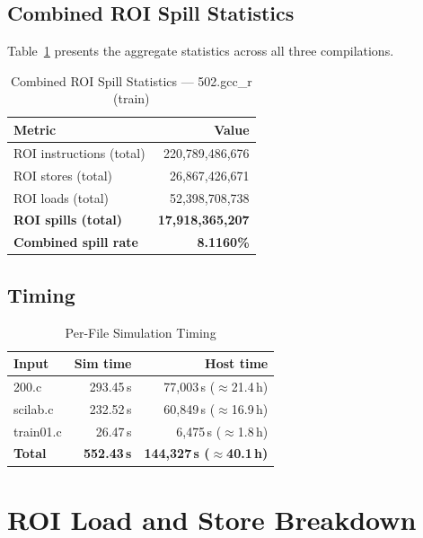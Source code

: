 \documentclass[conference]{IEEEtran}
\begin{document}
\subsection{Combined ROI Spill Statistics}

Table~\ref{tab:roi} presents the aggregate statistics across all
three compilations.

\begin{table}[H]
\centering
\caption{Combined ROI Spill Statistics --- 502.gcc\_r (train)}
\label{tab:roi}
\begin{tabular}{lr}
\toprule
\textbf{Metric} & \textbf{Value} \\
\midrule
ROI instructions (total)   & 220,789,486,676 \\
ROI stores (total)         &  26,867,426,671 \\
ROI loads (total)          &  52,398,708,738 \\
\midrule
\textbf{ROI spills (total)} & \textbf{17,918,365,207} \\
\textbf{Combined spill rate} & \textbf{8.1160\%} \\
\bottomrule
\end{tabular}
\end{table}

\subsection{Timing}

\begin{table}[H]
\centering
\caption{Per-File Simulation Timing}
\label{tab:timing}
\begin{tabular}{lrr}
\toprule
\textbf{Input} & \textbf{Sim time} & \textbf{Host time} \\
\midrule
200.c     & 293.45\,s & 77,003\,s ($\approx$21.4\,h) \\
scilab.c  & 232.52\,s & 60,849\,s ($\approx$16.9\,h) \\
train01.c &  26.47\,s &  6,475\,s ($\approx$1.8\,h) \\
\midrule
\textbf{Total} & \textbf{552.43\,s} & \textbf{144,327\,s ($\approx$40.1\,h)} \\
\bottomrule
\end{tabular}
\end{table}

\section{ROI Load and Store Breakdown}
\end{document}
